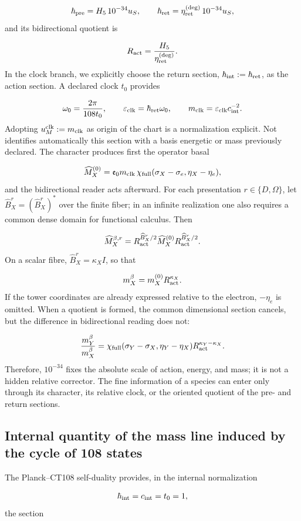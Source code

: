 \[
\hbar_{\rm pre}=H_5\,10^{-34}u_S,
\qquad
\hbar_{\rm ret}=\eta_{\rm ret}^{(\deg)}\,10^{-34}u_S,
\]
and its bidirectional quotient is

\[
R_{\rm act}=\frac{H_5}{\eta_{\rm ret}^{(\deg)}}.
\]
In the clock branch, we explicitly choose the return section, \(\hbar_{\rm int}:=\hbar_{\rm ret}\), as the action section. A declared clock \(t_0\) provides

\[
\omega_0=\frac{2\pi}{108t_0},
\qquad
\varepsilon_{\rm clk}=\hbar_{\rm ret}\omega_0,
\qquad
m_{\rm clk}=\varepsilon_{\rm clk}c_{\rm int}^{-2}.
\]
Adopting \(u_M^{\rm clk}:=m_{\rm clk}\) as origin of the chart is a normalization explicit. Not identifies automatically this section with a basis energetic or mass previously declared. The character produces first the operator basal

\[
\widehat M_X^{(0)}
=\mathfrak e_0m_{\rm clk}\,
\chi_{\rm full}(\sigma_X-\sigma_e,\eta_X-\eta_e),
\]
and the bidirectional reader acts afterward. For each presentation \(r\in\{D,\Omega\}\), let \(\widehat B_X^r=(\widehat B_X^r)^*\) over the finite fiber; in an infinite realization one also requires a common dense domain for functional calculus. Then

\[
\widehat M_X^{\beta,r}
=R_{\rm act}^{\widehat B_X^r/2}
\widehat M_X^{(0)}
R_{\rm act}^{\widehat B_X^r/2}.
\]
On a scalar fibre, \(\widehat B_X^r=\kappa_XI\), so that

\[
m_X^\beta=m_X^{(0)}R_{\rm act}^{\kappa_X}.
\]
If the tower coordinates are already expressed relative to the electron, \(-\eta_e\) is omitted. When a quotient is formed, the common dimensional section cancels, but the difference in bidirectional reading does not:

\[
\frac{m_Y^\beta}{m_X^\beta}
=\chi_{\rm full}(\sigma_Y-\sigma_X,\eta_Y-\eta_X)
R_{\rm act}^{\kappa_Y-\kappa_X}.
\]
Therefore, \(10^{-34}\) fixes the absolute scale of action, energy, and mass; it is not a hidden relative corrector. The fine information of a species can enter only through its character, its relative clock, or the oriented quotient of the pre- and return sections.

\subsection{Internal quantity of the mass line induced by the cycle of 108 states}
The Planck--CT108 self-duality provides, in the internal normalization

\[
\hbar_{\rm int}=c_{\rm int}=t_0=1,
\]
the section

